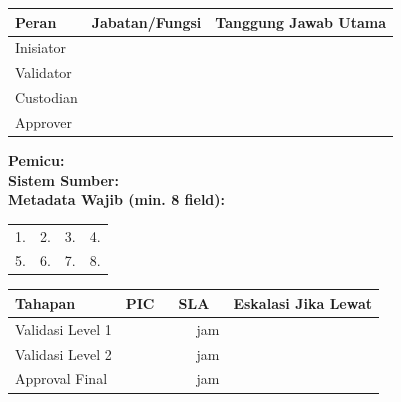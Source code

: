 \documentclass[12pt,a4paper]{report}
\newcommand{\fillline}[1][6cm]{\underline{\hspace{#1}}}
\begin{document}
\begin{tcolorbox}[colback=plnblue!3, colframe=plnblue!60, sharp corners, title={\small\bfseries Komponen 3: Peran \& Tanggung Jawab}, boxrule=0.8pt]
\small
\renewcommand{\arraystretch}{2.0}
\begin{tabularx}{\textwidth}{@{} >{\raggedright\arraybackslash}X >{\raggedright\arraybackslash}X >{\raggedright\arraybackslash}X @{}}
\toprule
\textbf{Peran} & \textbf{Jabatan/Fungsi} & \textbf{Tanggung Jawab Utama} \\
\midrule
Inisiator & & \\
\hline
Validator & & \\
\hline
Custodian & & \\
\hline
Approver & & \\
\bottomrule
\end{tabularx}
\renewcommand{\arraystretch}{1.0}
\end{tcolorbox}

\newpage

\begin{tcolorbox}[colback=plnblue!3, colframe=plnblue!60, sharp corners, title={\small\bfseries Komponen 4: Pemicu Sistem \& Metadata Wajib}, boxrule=0.8pt]
\noindent\textbf{Pemicu:} \fillline[10cm]\\[0.25cm]
\textbf{Sistem Sumber:} \fillline[10cm]\\[0.25cm]
\textbf{Metadata Wajib (min. 8 field):}\\[0.2cm]
\begin{tabularx}{\textwidth}{@{} X X X X @{}}
1. \fillline[3cm] & 2. \fillline[3cm] & 3. \fillline[3cm] & 4. \fillline[3cm] \\[0.35cm]
5. \fillline[3cm] & 6. \fillline[3cm] & 7. \fillline[3cm] & 8. \fillline[3cm] \\
\end{tabularx}
\end{tcolorbox}

\vspace{0.2cm}

\begin{tcolorbox}[colback=plnblue!3, colframe=plnblue!60, sharp corners, title={\small\bfseries Komponen 5: Alur Validasi \& SLA}, boxrule=0.8pt]
\small
\renewcommand{\arraystretch}{2.0}
\begin{tabularx}{\textwidth}{@{} >{\raggedright\arraybackslash}X >{\raggedright\arraybackslash}X c >{\raggedright\arraybackslash}X @{}}
\toprule
\textbf{Tahapan} & \textbf{PIC} & \textbf{SLA} & \textbf{Eskalasi Jika Lewat} \\
\midrule
Validasi Level 1 & & ~~~~jam & \\
\hline
Validasi Level 2 & & ~~~~jam & \\
\hline
Approval Final & & ~~~~jam & \\
\bottomrule
\end{tabularx}
\renewcommand{\arraystretch}{1.0}
\end{tcolorbox}
\end{document}
